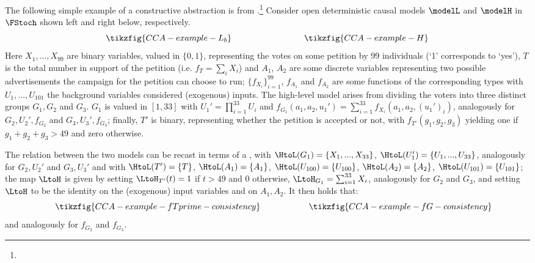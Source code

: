 \documentclass{article}
\begin{document}
\begin{example} \label{ex:CCA} 
	The following simple example of a constructive abstraction is from \cite{BeckersEtAl_2019_AbstractingCausalModles}.\footnote{} Consider open deterministic causal models $\modelL$ and $\modelH$ in $\FStoch$ shown left and right below, respectively. 
	\begin{equation} \label{eq:CCA-example-models}
		\tikzfig{CCA-example-L_b} 
		\hspace*{3cm}
		\tikzfig{CCA-example-H}
	\end{equation}
	Here $X_1,..., X_{99}$ are binary variables, valued in $\{0,1\}$, representing the votes on some petition by 99 individuals (`1' corresponds to `yes'), $T$ is the total number in support of the petition (i.e. $f_T = \sum_i X_i$) and $A_1$, $A_2$ are some discrete variables representing two possible advertisements the campaign for the petition can choose to run; $\{f_{X_i}\}_{i=1}^{99}$, $f_{A_1}$ and $f_{A_2}$ are some functions of the corresponding types with $U_{1},..., U_{101}$ the background variables considered (exogenous) inputs. 
	The high-level model arises from dividing the voters into three distinct groups 
	$G_1,G_2$ and $G_3$. 
	$G_1$ is valued in $[1,33]$ with $U_1' = \prod_{i=1}^{33} U_i$ and $f_{G_1}(a_1,a_2,u_1') = \sum_{i=1}^{33} f_{X_i}(a_1,a_2,(u_1')_i)$, analogously for $G_2, U_2',f_{G_2}$ and $G_3, U_3', f_{G_3}$; finally, $T'$ is binary, representing whether the petition is accepted or not, with $f_{T'}(g_1,g_2,g_3)$ yielding one if $g_1+g_2+g_3 > 49$ and zero otherwise. 
	
The relation between the two models can be recast in terms of a \varalign, with 
	$\HtoL(G_1)=\{X_1,...,X_{33}\}$, $\HtoL(U_1')=\{U_1,...,U_{33}\}$, analogously for $G_2,U_2'$ and $G_3,U_3'$ and with $\HtoL(T')=\{T\}$, $\HtoL(A_1)=\{A_1 \}$, $\HtoL(U_{100})=\{U_{100} \}$, $\HtoL(A_2)=\{A_2\}$, $\HtoL(U_{101})=\{U_{101}\}$; 
	the map $\LtoH$ is given by setting $\LtoH_{T'}(t) = 1$  if $t>49$ and $0$ otherwise, $\LtoH_{G_1} = \sum_{i=1}^{33} X_i$, analogously for $G_2$ and $G_3$, and setting $\LtoH$ to be the identity on the (exogenous) input variables and on $A_1,A_2$. 
	It then holds that: 
	\begin{equation} \label{eq:CCA-example-mechanism-consistency}
		\tikzfig{CCA-example-fTprime-consistency} 
		\hspace*{2.0cm}
		\tikzfig{CCA-example-fG-consistency}
		\hspace*{-0.5cm}
	\end{equation}
	and analogously for $f_{G_2}$ and $f_{G_3}$. 
	

\end{example}
\end{document}
